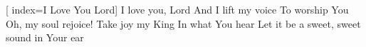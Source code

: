 [
index={I Love You Lord}]
\beginverse	
I love you, Lord 
And I lift my voice 
To worship You 
Oh, my soul rejoice! 
Take joy my King 
In what You hear 
Let it be a sweet, sweet sound in Your ear 
\endverse


\endsong